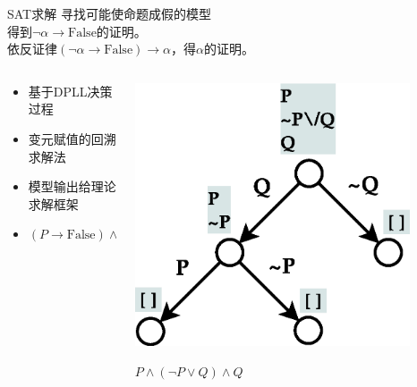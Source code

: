 \documentclass{beamer}
\begin{document}
\begin{frame}[fragile]
  \begin{block}{SAT求解}
    寻找可能使命题成假的模型 \\
    得到$\lnot \alpha \rightarrow \mathrm{False}$的证明。\\
    依反证律$(\lnot \alpha \rightarrow \mathrm{False}) \rightarrow \alpha$，得$\alpha$的证明。
  \end{block}
  \begin{block}{}
    \begin{columns}
      
      \begin{column}{0.6\textwidth}
      
        \begin{itemize}
        \item 基于DPLL决策过程
        \item 变元赋值的回溯求解法
        \item 模型输出给理论求解框架
        \item $(P \rightarrow \mathrm{False}) \land (\lnot P \rightarrow \mathrm{False}) \rightarrow \mathrm{False}$
        \end{itemize}
      \end{column}

      \begin{column}{0.4\textwidth}
        \includegraphics[width=0.85\textwidth]{sat.eps}

        $P \land (\lnot P \lor Q) \land Q$
      \end{column}

    \end{columns}

  \end{block}
\end{frame}
\end{document}
